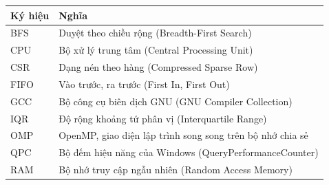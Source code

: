 \begin{tabularx}{\textwidth}{@{}lX@{}}
\toprule
Ký hiệu & Nghĩa \\
\midrule
BFS & Duyệt theo chiều rộng (Breadth-First Search) \\
CPU & Bộ xử lý trung tâm (Central Processing Unit) \\
CSR & Dạng nén theo hàng (Compressed Sparse Row) \\
FIFO & Vào trước, ra trước (First In, First Out) \\
GCC & Bộ công cụ biên dịch GNU (GNU Compiler Collection) \\
IQR & Độ rộng khoảng tứ phân vị (Interquartile Range) \\
OMP & OpenMP, giao diện lập trình song song trên bộ nhớ chia sẻ \\
QPC & Bộ đếm hiệu năng của Windows (QueryPerformanceCounter) \\
RAM & Bộ nhớ truy cập ngẫu nhiên (Random Access Memory) \\
\bottomrule
\end{tabularx}

\clearpage
{}




\cleardoublepage
{}
{}
{\fontsize{10.5}{11.5}\selectfont\singlespacing\raggedright{}
\apptocmd{\thebibliography}{\setlength{\itemsep}{1.5pt}\setlength{\parsep}{0pt}}{}{}
}
\appendix
{}
\renewcommand{\chaptername}{Phụ lục}



